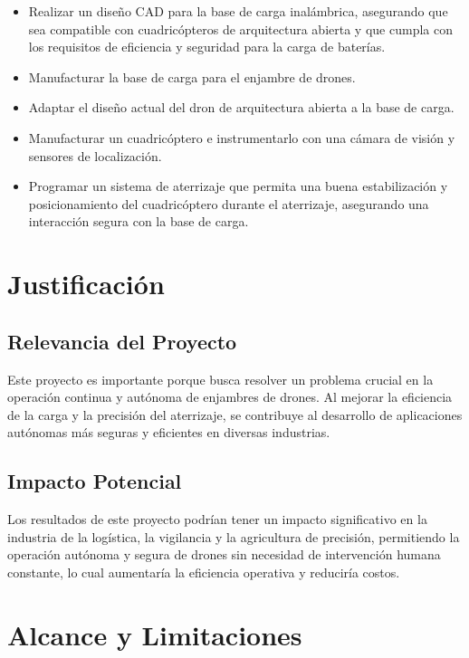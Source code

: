\begin{itemize}
    \item Realizar un diseño CAD para la base de carga inalámbrica, asegurando que sea compatible con cuadricópteros de arquitectura abierta y que cumpla con los requisitos de eficiencia y seguridad para la carga de baterías.
    \item Manufacturar la base de carga para el enjambre de drones.
    \item Adaptar el diseño actual del dron de arquitectura abierta a la base de carga.
    \item Manufacturar un cuadricóptero e instrumentarlo con una cámara de visión y sensores de localización.
    \item Programar un sistema de aterrizaje que permita una buena estabilización y posicionamiento del cuadricóptero durante el aterrizaje, asegurando una interacción segura con la base de carga.
\end{itemize}

\section{Justificación}

\subsection{Relevancia del Proyecto}

Este proyecto es importante porque busca resolver un problema crucial en la operación continua y autónoma de enjambres de drones. Al mejorar la eficiencia de la carga y la precisión del aterrizaje, se contribuye al desarrollo de aplicaciones autónomas más seguras y eficientes en diversas industrias.

\subsection{Impacto Potencial}

Los resultados de este proyecto podrían tener un impacto significativo en la industria de la logística, la vigilancia y la agricultura de precisión, permitiendo la operación autónoma y segura de drones sin necesidad de intervención humana constante, lo cual aumentaría la eficiencia operativa y reduciría costos.

\section{Alcance y Limitaciones}

